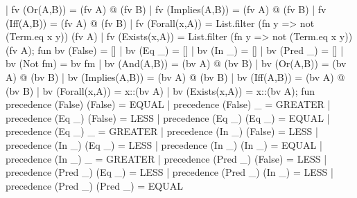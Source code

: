   | fv (Or(A,B)) = (fv A) @ (fv B)
  | fv (Implies(A,B)) = (fv A) @ (fv B)
  | fv (Iff(A,B)) = (fv A) @ (fv B)
  | fv (Forall(x,A)) = List.filter (fn y => not (Term.eq x y))
                                   (fv A)
  | fv (Exists(x,A)) = List.filter (fn y => not (Term.eq x y))
                                   (fv A);
\eatline
{}\nwendcode{}\nwdocspar
\nwenddocs{}\endmoddef\nwstartdeflinemarkup{}\nwenddeflinemarkup
fun bv (False) = []
  | bv (Eq _) = []
  | bv (In _) = []
  | bv (Pred _) = []
  | bv (Not fm) = bv fm
  | bv (And(A,B)) = (bv A) @ (bv B)
  | bv (Or(A,B)) = (bv A) @ (bv B)
  | bv (Implies(A,B)) = (bv A) @ (bv B)
  | bv (Iff(A,B)) = (bv A) @ (bv B)
  | bv (Forall(x,A)) = x::(bv A)
  | bv (Exists(x,A)) = x::(bv A);
\eatline
{}\nwendcode{}\nwdocspar
\nwenddocs{}\endmoddef\nwstartdeflinemarkup{}\nwenddeflinemarkup
fun precedence (False) (False) = EQUAL
  | precedence (False) _ = GREATER
  | precedence (Eq _) (False) = LESS
  | precedence (Eq _) (Eq _) = EQUAL
  | precedence (Eq _) _ =  GREATER
  | precedence (In _) (False) = LESS
  | precedence (In _) (Eq _) = LESS
  | precedence (In _) (In _) = EQUAL
  | precedence (In _) _ = GREATER
  | precedence (Pred _) (False) = LESS
  | precedence (Pred _) (Eq _) = LESS
  | precedence (Pred _) (In _) = LESS
  | precedence (Pred _) (Pred _) = EQUAL
